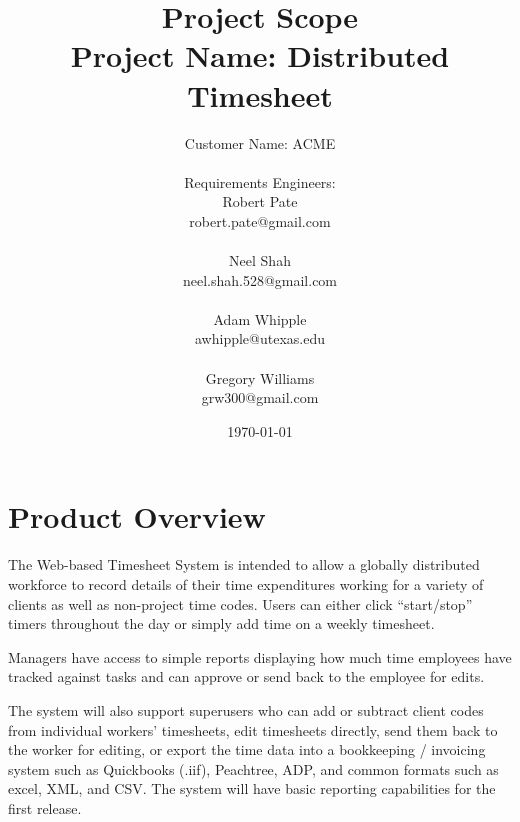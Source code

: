 \documentclass[12pt]{article}
\begin{document}
\begin{titlepage}
\title{{\Huge Project Scope}\\
{\huge \color{cyan}Project Name: Distributed Timesheet}}
\author{{\huge{\color{blue}Customer Name: ACME}}\\
	\\{\small Requirements Engineers:}
\\Robert Pate\\robert.pate@gmail.com\\\\Neel Shah\\neel.shah.528@gmail.com\\\\Adam Whipple\\awhipple@utexas.edu\\\\Gregory Williams\\grw300@gmail.com}
\date{\today}



\maketitle
\vfill
\end{titlepage}

\section{Product Overview}

The Web-based Timesheet System is intended to allow a globally distributed workforce to record details of their time expenditures working for a variety of clients as well as non-project time codes.  Users can either click “start/stop” timers throughout the day or simply add time on a weekly timesheet.

Managers have access to simple reports displaying how much time employees have tracked against tasks and can approve or send back to the employee for edits.

The system will also support superusers who can add or subtract client codes from individual workers’ timesheets, edit timesheets directly, send them back to the worker for editing, or export the time data into a bookkeeping / invoicing system such as Quickbooks (.iif), Peachtree, ADP, and common formats such as excel, XML, and CSV. The system will have basic reporting capabilities for the first release.
\end{document}
